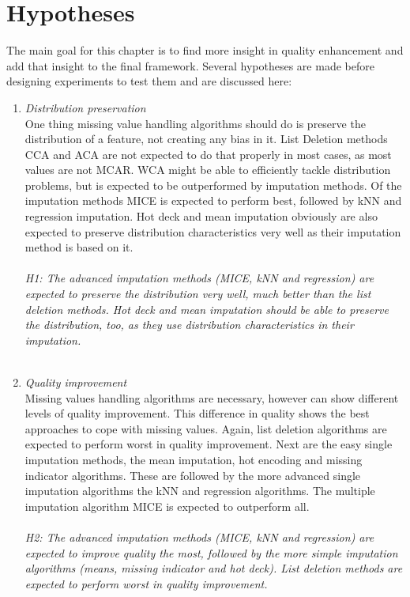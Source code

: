 \documentclass[10pt,a4paper]{report}
\begin{document}
	
	\section{Hypotheses}
	\label{MVsec:Hypothesis}
	
	The main goal for this chapter is to find more insight in quality enhancement and add that insight to the final framework. Several hypotheses are made before designing experiments to test them and are discussed here:
	
	\begin{enumerate}
		\item \textit{Distribution preservation} \\
		One thing missing value handling algorithms should do is preserve the distribution of a feature, not creating any bias in it. List Deletion methods CCA and ACA are not expected to do that properly in most cases, as most values are not MCAR. WCA might be able to efficiently tackle distribution problems, but is expected to be outperformed by imputation methods. Of the imputation methods MICE is expected to perform best, followed by kNN and regression imputation. Hot deck and mean imputation obviously are also expected to preserve distribution characteristics very well as their imputation method is based on it. \\
		\\
		\emph{H1: The advanced imputation methods (MICE, kNN and regression) are expected to preserve the distribution very well, much better than the list deletion methods. Hot deck and mean imputation should be able to preserve the distribution, too, as they use distribution characteristics in their imputation.}\\
		\\
		\item \textit{Quality improvement} \\
		Missing values handling algorithms are necessary, however can show different levels of quality improvement. This difference in quality shows the best approaches to cope with missing values. Again, list deletion algorithms are expected to perform worst in quality improvement. Next are the easy single imputation methods, the mean imputation, hot encoding and missing indicator algorithms. These are followed by the more advanced single imputation algorithms the kNN and regression algorithms. The multiple imputation algorithm MICE is expected to outperform all.\\
		\\
		\emph{H2: The advanced imputation methods (MICE, kNN and regression) are expected to improve quality the most, followed by the more simple imputation algorithms (means, missing indicator and hot deck). List deletion methods are expected to perform worst in quality improvement.}\\
		\\
	\end{enumerate}
	
\end{document}
